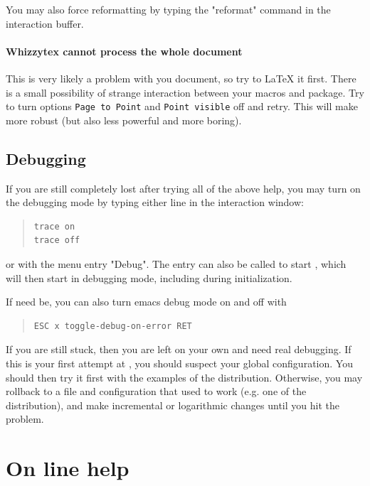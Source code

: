 \documentclass[12pt]{article}
\begin{document}
You may also force reformatting by typing the \lst"reformat" command
in the interaction buffer.


\paragraph {Whizzytex cannot process the whole document}

This is very likely a problem with you document, so try to {\LaTeX} it
first. There is a small possibility of strange interaction between
your macros and {\whizzy} package. Try to turn options
{\tt Page to Point} and {\tt Point visible} off and retry.
This will make {\whizzy} more robust (but also less powerful and more
boring).

\subsection {Debugging}

If you are still completely lost after trying all of the above help, you may
turn on the debugging mode by typing either line in the interaction window:
\begin{quote}
\begin{verbatim}
trace on
trace off
\end{verbatim}
\end{quote}
or with the menu entry \lst"Debug".
The entry can also be called to start {\whizzy}, which will then start in
debugging mode, including during initialization.

If need be, you can also turn emacs debug mode on and off with
\begin{quote}
\begin{verbatim}
ESC x toggle-debug-on-error RET
\end{verbatim}
\end{quote}

If you are still stuck, then you are left on your own and need real
debugging.  If this is your first attempt at {\whizzy}, you should suspect
your global configuration. You should then try it first with the examples of
the distribution.  Otherwise, you may rollback to a file and configuration
that used to work (e.g. one of the distribution), and make incremental or
logarithmic changes until you hit the problem.

\section{On line help}
\end{document}
